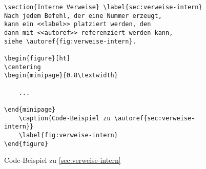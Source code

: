 \begin{figure}[ht]
\centering
\begin{minipage}{0.8\textwidth}
\begin{verbatim}
\section{Interne Verweise} \label{sec:verweise-intern}
Nach jedem Befehl, der eine Nummer erzeugt, 
kann ein <<label>> platziert werden, den 
dann mit <<autoref>> referenziert werden kann, 
siehe \autoref{fig:verweise-intern}.

\begin{figure}[ht]
\centering
\begin{minipage}{0.8\textwidth}

	...

\end{minipage}
	\caption{Code-Beispiel zu \autoref{sec:verweise-intern}}
	\label{fig:verweise-intern}
\end{figure}
\end{verbatim}
\end{minipage}
	\caption{Code-Beispiel zu \autoref{sec:verweise-intern}}
	\label{fig:verweise-intern}
\end{figure}



